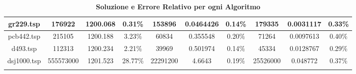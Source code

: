 \begin{longtable}{|c|c|c|c|c|c|c|c|c|c|}
gr229.tsp        & 176922             & 1200.068           & 0.31\%          & 153896             & 0.0464426          & 0.14\%          & 179335             & 0.0031117          & 0.33\%          \\ \hline
pcb442.tsp       & 215105             & 1200.188           & 3.23\%          & 60834              & 0.355548           & 0.20\%          & 71264              & 0.0097613          & 0.40\%          \\ \hline
d493.tsp         & 112313             & 1200.234           & 2.21\%          & 39969              & 0.501974           & 0.14\%          & 45334              & 0.0128767          & 0.29\%          \\ \hline
dsj1000.tsp      & 555573000          & 1201.523           & 28.77\%         & 22291200           & 4.6643             & 0.19\%          & 25526000           & 0.048772           & 0.37\%          \\ \hline
\caption{\textbf{Soluzione e Errore Relativo per ogni Algoritmo}}
\end{longtable}